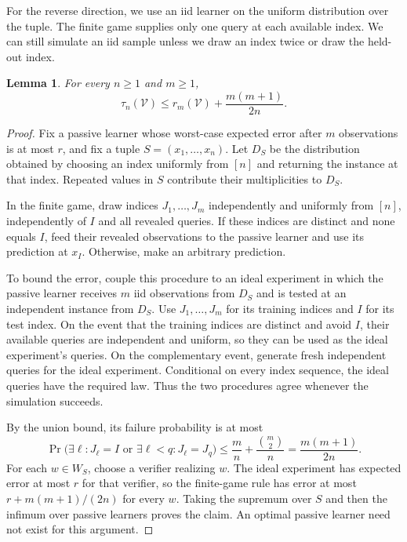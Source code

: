 \documentclass[11pt]{article}
\newcommand{\V}{\mathcal V}
\newtheorem{lemma}[theorem]{Lemma}
\begin{document}
For the reverse direction, we use an iid learner on the uniform distribution
over the tuple. The finite game supplies only one query at each available
index. We can still simulate an iid sample unless we draw an index twice or
draw the held-out index.

\begin{lemma}\label{lem:finite-from-batch}
For every $n\ge1$ and $m\ge1$,
\[
\tau_n(\V)\le r_m(\V)+\frac{m(m+1)}{2n}.
\]
\end{lemma}
\begin{proof}
Fix a passive learner whose worst-case expected error after $m$ observations
is at most $r$, and fix a tuple $S=(x_1,\ldots,x_n)$. Let $D_S$ be the
distribution obtained by choosing an index uniformly from $[n]$ and
returning the instance at that index. Repeated values in $S$ contribute
their multiplicities to $D_S$.

In the finite game, draw indices $J_1,\ldots,J_m$ independently and
uniformly from $[n]$, independently of $I$ and all revealed queries. If
these indices are distinct and none equals $I$, feed their revealed
observations to the passive learner and use its prediction at $x_I$.
Otherwise, make an arbitrary prediction.

To bound the error, couple this procedure to an ideal experiment in which
the passive learner receives $m$ iid observations from $D_S$ and is tested
at an independent instance from $D_S$. Use $J_1,\ldots,J_m$ for its
training indices and $I$ for its test index. On the event that the training
indices are distinct and avoid $I$, their available queries are independent
and uniform, so they can be used as the ideal experiment's queries. On the
complementary event, generate fresh independent queries for the ideal
experiment. Conditional on every index sequence, the ideal queries have
the required law. Thus the two procedures agree whenever the simulation
succeeds.

By the union bound, its failure probability is at most
\[
\Pr\bigl(\exists\ell:J_\ell=I
  \text{ or }\exists\ell<q:J_\ell=J_q\bigr)
\le\frac mn+\frac{\binom m2}{n}
=\frac{m(m+1)}{2n}.
\]
For each $w\in W_S$, choose a verifier realizing $w$. The ideal experiment
has expected error at most $r$ for that verifier, so the finite-game rule
has error at most $r+m(m+1)/(2n)$ for every $w$. Taking the supremum over
$S$ and then the infimum over passive learners proves the claim. An optimal
passive learner need not exist for this argument.
\end{proof}
\end{document}
